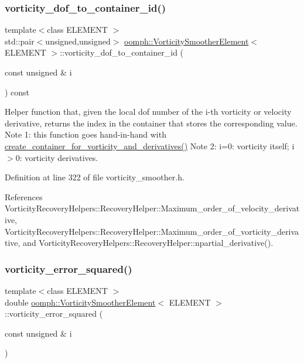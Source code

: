 \subsubsection{\texorpdfstring{vorticity\+\_\+dof\+\_\+to\+\_\+container\+\_\+id()}{vorticity\_dof\_to\_container\_id()}}
{\footnotesize\ttfamily template$<$class E\+L\+E\+M\+E\+NT $>$ \\
std\+::pair$<$unsigned,unsigned$>$ \hyperlink{classoomph_1_1VorticitySmootherElement}{oomph\+::\+Vorticity\+Smoother\+Element}$<$ E\+L\+E\+M\+E\+NT $>$\+::vorticity\+\_\+dof\+\_\+to\+\_\+container\+\_\+id (\begin{DoxyParamCaption}\item[{const unsigned \&}]{i }\end{DoxyParamCaption}) const\hspace{0.3cm}{\ttfamily [inline]}}



Helper function that, given the local dof number of the i-\/th vorticity or velocity derivative, returns the index in the container that stores the corresponding value. Note 1\+: this function goes hand-\/in-\/hand with \hyperlink{classoomph_1_1VorticitySmootherElement_a84300b8d30090a7275a1e0233546b683}{create\+\_\+container\+\_\+for\+\_\+vorticity\+\_\+and\+\_\+derivatives()} Note 2\+: i=0\+: vorticity itself; i$>$0\+: vorticity derivatives. 



Definition at line 322 of file vorticity\+\_\+smoother.\+h.



References Vorticity\+Recovery\+Helpers\+::\+Recovery\+Helper\+::\+Maximum\+\_\+order\+\_\+of\+\_\+velocity\+\_\+derivative, Vorticity\+Recovery\+Helpers\+::\+Recovery\+Helper\+::\+Maximum\+\_\+order\+\_\+of\+\_\+vorticity\+\_\+derivative, and Vorticity\+Recovery\+Helpers\+::\+Recovery\+Helper\+::npartial\+\_\+derivative().

\mbox{\label{classoomph_1_1VorticitySmootherElement_a6987508c3afae70605d1bc73b27607d6}} 
\subsubsection{\texorpdfstring{vorticity\+\_\+error\+\_\+squared()}{vorticity\_error\_squared()}}
{\footnotesize\ttfamily template$<$class E\+L\+E\+M\+E\+NT $>$ \\
double \hyperlink{classoomph_1_1VorticitySmootherElement}{oomph\+::\+Vorticity\+Smoother\+Element}$<$ E\+L\+E\+M\+E\+NT $>$\+::vorticity\+\_\+error\+\_\+squared (\begin{DoxyParamCaption}\item[{const unsigned \&}]{i }\end{DoxyParamCaption})\hspace{0.3cm}{\ttfamily [inline]}}



